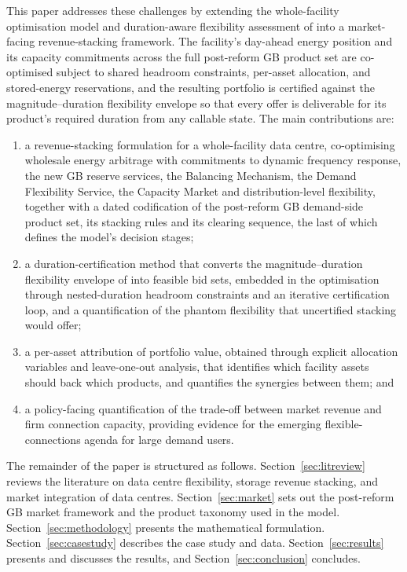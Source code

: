 \documentclass[lettersize,journal]{IEEEtran}
\begin{document}
This paper addresses these challenges by extending the whole-facility optimisation model and duration-aware flexibility assessment of \cite{takci2026characterisation} into a market-facing revenue-stacking framework. The facility's day-ahead energy position and its capacity commitments across the full post-reform GB product set are co-optimised subject to shared headroom constraints, per-asset allocation, and stored-energy reservations, and the resulting portfolio is certified against the magnitude--duration flexibility envelope so that every offer is deliverable for its product's required duration from any callable state. The main contributions are:
\begin{enumerate}
    \item a revenue-stacking formulation for a whole-facility data centre, co-optimising wholesale energy arbitrage with commitments to dynamic frequency response, the new GB reserve services, the Balancing Mechanism, the Demand Flexibility Service, the Capacity Market and distribution-level flexibility, together with a dated codification of the post-reform GB demand-side product set, its stacking rules and its clearing sequence, the last of which defines the model's decision stages;
    \item a duration-certification method that converts the magnitude--duration flexibility envelope of \cite{takci2026characterisation} into feasible bid sets, embedded in the optimisation through nested-duration headroom constraints and an iterative certification loop, and a quantification of the phantom flexibility that uncertified stacking would offer;
    \item a per-asset attribution of portfolio value, obtained through explicit allocation variables and leave-one-out analysis, that identifies which facility assets should back which products, and quantifies the synergies between them; and
    \item a policy-facing quantification of the trade-off between market revenue and firm connection capacity, providing evidence for the emerging flexible-connections agenda for large demand users.
\end{enumerate}

The remainder of the paper is structured as follows. Section~\ref{sec:litreview} reviews the literature on data centre flexibility, storage revenue stacking, and market integration of data centres. Section~\ref{sec:market} sets out the post-reform GB market framework and the product taxonomy used in the model. Section~\ref{sec:methodology} presents the mathematical formulation. Section~\ref{sec:casestudy} describes the case study and data. Section~\ref{sec:results} presents and discusses the results, and Section~\ref{sec:conclusion} concludes.
\end{document}
